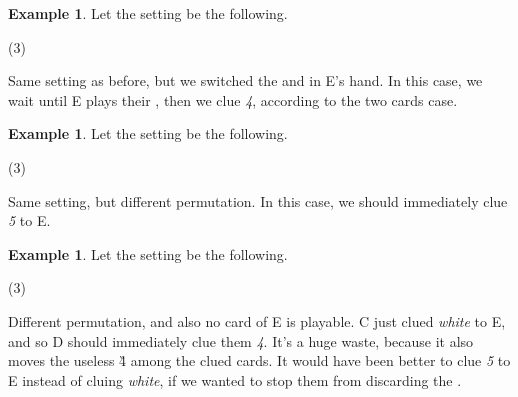 \documentclass[a4paper]{article}
\theoremstyle{plain}
\theoremstyle{definition}
\newtheorem{example}[theorem]{Example}
\begin{document}
\begin{example}
	
	Let the setting be the following.
	
	\begin{tasks}(3)
		\task[+]      
		\task[A]    
		\task[B]    
		\task[C]    
		\task[D]    
		\task[E]    
	\end{tasks}
	
	Same setting as before, but we switched the  and  in E's hand. In this case, we wait until E plays their , then we clue \textit{4}, according to the two cards case.
	
\end{example}

\begin{example}
	
	Let the setting be the following.
	
	\begin{tasks}(3)
		\task[+]      
		\task[A]    
		\task[B]    
		\task[C]    
		\task[D]    
		\task[E]    
	\end{tasks}
	
	Same setting, but different permutation. In this case, we should immediately clue \textit{5} to E.
	
\end{example}

\begin{example}
	
	Let the setting be the following.
	
	\begin{tasks}(3)
		\task[+]      
		\task[A]    
		\task[B]    
		\task[C]    
		\task[D]    
		\task[E]    
	\end{tasks}
	
	Different permutation, and also no card of E is playable. C just clued \textit{white} to E, and so D should immediately clue them \textit{4}. It's a huge waste, because it also moves the useless \G{4} among the clued cards. It would have been better to clue \textit{5} to E instead of cluing \textit{white}, if we wanted to stop them from discarding the .
	
\end{example}
\end{document}
